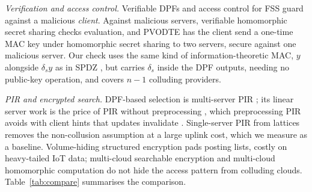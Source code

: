 \emph{Verification and access control.} Verifiable DPFs
\citep{decastro2022lightweight} and access control for FSS
\citep{pacl,ji2023finegrained} guard against a malicious \emph{client}. Against
malicious servers, verifiable homomorphic secret sharing
\citep{choudhuri2024vehss} checks evaluation, and PVODTE \citep{li2026silent}
has the client send a one-time MAC key under homomorphic secret sharing to two
servers, secure against one malicious server. Our check uses the same kind of
information-theoretic MAC, $y$ alongside $\delta_s y$ as in SPDZ
\citep{damgard2012spdz}, but carries $\delta_s$ inside the DPF outputs, needing
no public-key operation, and covers $n-1$ colluding providers.

\emph{PIR and encrypted search.} DPF-based selection is multi-server PIR
\citep{chor1998private}; its linear server work is the price of PIR without
preprocessing \citep{beimel2000reducing}, which preprocessing PIR avoids with
client hints that updates invalidate \citep{corrigan2020private}. Single-server
PIR from lattices \citep{angel2018pir,menon2022spiral} removes the
non-collusion assumption at a large uplink cost, which we measure as a
baseline. Volume-hiding structured encryption
\citep{kamara2019computationally,patel2019mitigating} pads posting lists,
costly on heavy-tailed IoT data; multi-cloud searchable encryption
\citep{xu2021privacy,xu2023symmetric} and multi-cloud homomorphic computation
\citep{wang2020shamc} do not hide the access pattern from colluding clouds.
Table~\ref{tab:compare} summarises the comparison.

